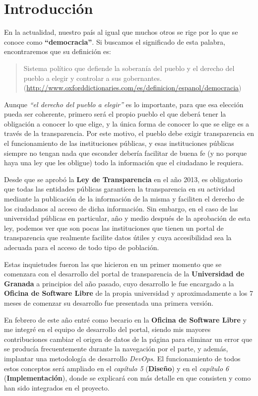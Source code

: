 \chapter{Introducción}

En la actualidad, nuestro país al igual que muchos otros se rige por lo que se conoce como \textbf{``democracia''}. Si buscamos
el significado de esta palabra, encontraremos que su definición es: 

\begin{quote}Sistema político que defiende la soberanía del pueblo y el derecho del pueblo a elegir y controlar a sus gobernantes.
\newline(\url{http://www.oxforddictionaries.com/es/definicion/espanol/democracia})
\end{quote}

Aunque \textit{``el derecho del pueblo a elegir''} es lo importante, para que esa elección pueda ser coherente, primero será el propio pueblo el que deberá tener la obligación a conocer lo que elige, y la única forma de conocer lo que se elige es a través de la transparencia. Por este motivo, el pueblo debe exigir transparencia en el funcionamiento de las instituciones públicas, y esas instituciones públicas siempre no tengan nada que esconder debería facilitar de buena fe (y no porque haya una ley que les obligue) todo la información que el ciudadano le requiera.

\bigskip
Desde que se aprobó la \textbf{Ley de Transparencia} en el año 2013, es obligatorio que todas las entidades públicas garanticen la transparencia en su actividad mediante la publicación de la información de la misma y faciliten el derecho de los ciudadanos al acceso de dicha información. Sin embargo, en el caso de las universidad públicas en particular, año y medio después de la aprobación de esta ley, podemos ver que son pocas las instituciones que tienen un portal de transparencia que realmente facilite datos útiles y cuya accesibilidad sea la adecuada para el acceso de todo tipo de población.

\bigskip
Estas inquietudes fueron las que hicieron en un primer momento que se comenzara con el desarrollo del portal de transparencia de la \textbf{Universidad de Granada} a principios del año pasado, cuyo desarrollo le fue encargado a la \textbf{Oficina de Software Libre} de la propia universidad y aproximadamente a los 7 meses de comenzar su desarrollo fue presentada una primera versión.

\bigskip
En febrero de este año entré como becario en la \textbf{Oficina de Software Libre} y me integré en el equipo de desarrollo del portal, siendo mis mayores contribuciones cambiar el origen de datos de la página para eliminar un error que se producía frecuentemente durante la navegación por el parte, y además, implantar una metodología de desarrollo \textit{DevOps}. El funcionamiento de todos estos conceptos será ampliado en el \textit{capítulo 5} (\textbf{Diseño}) y en el \textit{capítulo 6} (\textbf{Implementación}), donde se explicará con más detalle en que consisten y como han sido integrados en el proyecto.

